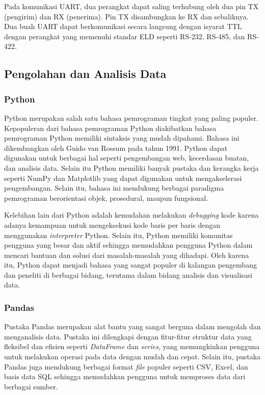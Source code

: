 Pada komunikasi UART, dua perangkat dapat saling terhubung oleh dua pin TX (pengirim) dan RX (penerima). Pin TX disambungkan ke RX dan sebaliknya. Dua buah UART dapat berkomunikasi secara langsung dengan isyarat TTL dengan perangkat yang memenuhi standar ELD seperti RS-232, RS-485, dan RS-422.

\subsection{Pengolahan dan Analisis Data}

\subsubsection{Python}
Python merupakan salah satu bahasa pemrograman tingkat yang paling populer. Kepopuleran dari bahasa pemrograman Python diakibatkan bahasa pemrograman Python memiliki sintaksis yang mudah dipahami. Bahasa ini dikembangkan oleh Guido van Rossum pada tahun 1991. Python dapat digunakan untuk berbagai hal seperti pengembangan web, kecerdasan buatan, dan analisis data. Selain itu Python memiliki banyak pustaka dan kerangka kerja seperti NumPy dan Matplotlib yang dapat digunakan untuk mengakselerasi pengembangan. Selain itu, bahasa ini mendukung berbagai paradigma pemrograman berorientasi objek, prosedural, maupun fungsional.

Kelebihan lain dari Python adalah kemudahan melakukan \textit{debugging} kode karena adanya kemampuan untuk mengeksekusi kode baris per baris dengan menggunakan \textit{interpreter} Python. Selain itu, Python memiliki komunitas pengguna yang besar dan aktif sehingga memudahkan pengguna Python dalam mencari bantuan dan solusi dari masalah-masalah yang dihadapi. Oleh karena itu, Python dapat menjadi bahasa yang sangat populer di kalangan pengembang dan peneliti di berbagai bidang, terutama dalam bidang analisis dan visualisasi data.

\subsubsection{Pandas}
Pustaka Pandas merupakan alat bantu yang sangat berguna dalam mengolah dan menganalisis data. Pustaka ini dilengkapi dengan fitur-fitur struktur data yang fleksibel dan efisien seperti \textit{DataFrame} dan \textit{series}, yang memungkinkan pengguna untuk melakukan operasi pada data dengan mudah dan cepat. Selain itu, pustaka Pandas juga mendukung berbagai format \textit{file} populer seperti CSV, Excel, dan basis data SQL sehingga memudahkan pengguna untuk memproses data dari berbagai sumber.

